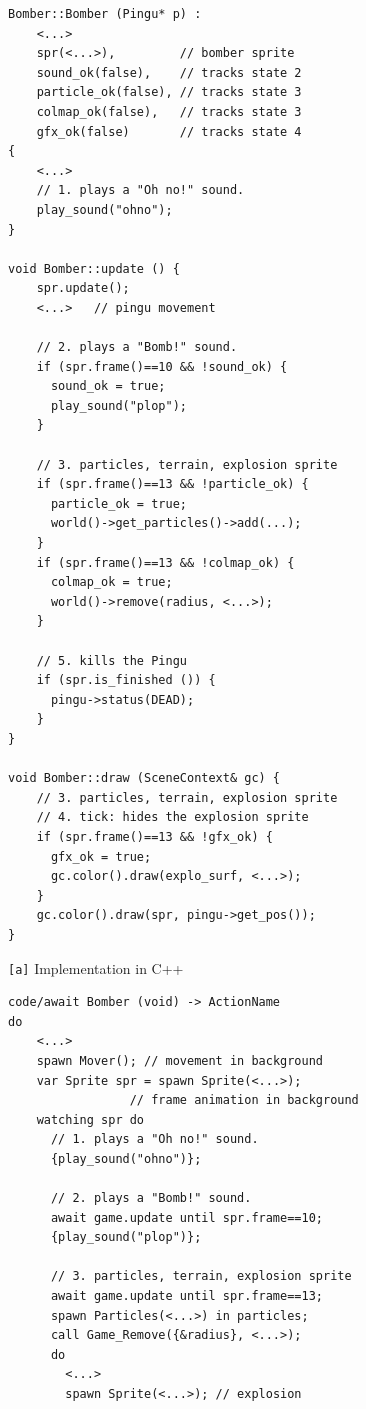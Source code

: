 \documentclass[times,twocolumn,final]{elsarticle}
\newcommand{\code}[1] {{\small{\texttt{#1}}}}
\newcommand{\ax}{\code{[a]}\xspace}
\begin{document}
\begin{figure}
\begin{minipage}[t]{0.50\linewidth}
\begin{lstlisting}[numbers=right]
Bomber::Bomber (Pingu* p) :
    <...>
    spr(<...>),         // bomber sprite
    sound_ok(false),    // tracks state 2
    particle_ok(false), // tracks state 3
    colmap_ok(false),   // tracks state 3
    gfx_ok(false)       // tracks state 4
{
    <...>
    // 1. plays a "Oh no!" sound.
    play_sound("ohno");
}

void Bomber::update () {
    spr.update();
    <...>   // pingu movement

    // 2. plays a "Bomb!" sound.
    if (spr.frame()==10 && !sound_ok) {
      sound_ok = true;
      play_sound("plop");
    }

    // 3. particles, terrain, explosion sprite
    if (spr.frame()==13 && !particle_ok) {
      particle_ok = true;
      world()->get_particles()->add(...);
    }
    if (spr.frame()==13 && !colmap_ok) {
      colmap_ok = true;
      world()->remove(radius, <...>);
    }

    // 5. kills the Pingu
    if (spr.is_finished ()) {
      pingu->status(DEAD);
    }
}

void Bomber::draw (SceneContext& gc) {
    // 3. particles, terrain, explosion sprite
    // 4. tick: hides the explosion sprite
    if (spr.frame()==13 && !gfx_ok) {
      gfx_ok = true;
      gc.color().draw(explo_surf, <...>);
    }
    gc.color().draw(spr, pingu->get_pos());
}
\end{lstlisting}
\centering\small{\ax Implementation in C++}
\end{minipage}
%
\begin{minipage}[t]{0.50\linewidth}
\begin{lstlisting}[xleftmargin=2em]
code/await Bomber (void) -> ActionName
do
    <...>
    spawn Mover(); // movement in background
    var Sprite spr = spawn Sprite(<...>);
                 // frame animation in background
    watching spr do
      // 1. plays a "Oh no!" sound.
      {play_sound("ohno")};

      // 2. plays a "Bomb!" sound.
      await game.update until spr.frame==10;
      {play_sound("plop")};

      // 3. particles, terrain, explosion sprite
      await game.update until spr.frame==13;
      spawn Particles(<...>) in particles;
      call Game_Remove({&radius}, <...>);
      do
        <...>
        spawn Sprite(<...>); // explosion


\end{lstlisting}
\end{minipage}
\end{figure}
\end{document}
